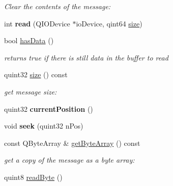 \begin{DoxyCompactItemize}
\begin{DoxyCompactList}\small\item\em Clear the contents of the message\+: \end{DoxyCompactList}\item 
int {\bfseries read} (Q\+I\+O\+Device $\ast$io\+Device, qint64 \hyperlink{class_i_o_buffer_a42b956c3deeece1c211f4d907b81df4f}{size})\hypertarget{class_i_o_buffer_afd3ae083064e09c37ed3051396aa77bd}{}\label{class_i_o_buffer_afd3ae083064e09c37ed3051396aa77bd}

\item 
bool \hyperlink{class_i_o_buffer_a8c1daae319f96022aa7581d599fa9c42}{has\+Data} ()\hypertarget{class_i_o_buffer_a8c1daae319f96022aa7581d599fa9c42}{}\label{class_i_o_buffer_a8c1daae319f96022aa7581d599fa9c42}

\begin{DoxyCompactList}\small\item\em returns true if there is still data in the buffer to read \end{DoxyCompactList}\item 
quint32 \hyperlink{class_i_o_buffer_a42b956c3deeece1c211f4d907b81df4f}{size} () const \hypertarget{class_i_o_buffer_a42b956c3deeece1c211f4d907b81df4f}{}\label{class_i_o_buffer_a42b956c3deeece1c211f4d907b81df4f}

\begin{DoxyCompactList}\small\item\em get message size\+: \end{DoxyCompactList}\item 
quint32 {\bfseries current\+Position} ()\hypertarget{class_i_o_buffer_addf52c4c0142a77cc813901b89142532}{}\label{class_i_o_buffer_addf52c4c0142a77cc813901b89142532}

\item 
void {\bfseries seek} (quint32 n\+Pos)\hypertarget{class_i_o_buffer_a6b2f3efb10d9d153e15f86d5af83123f}{}\label{class_i_o_buffer_a6b2f3efb10d9d153e15f86d5af83123f}

\item 
const Q\+Byte\+Array \& \hyperlink{class_i_o_buffer_a6a21eeca1fead702fc3a92f996e40e22}{get\+Byte\+Array} () const \hypertarget{class_i_o_buffer_a6a21eeca1fead702fc3a92f996e40e22}{}\label{class_i_o_buffer_a6a21eeca1fead702fc3a92f996e40e22}

\begin{DoxyCompactList}\small\item\em get a copy of the message as a byte array\+: \end{DoxyCompactList}\item 
quint8 \hyperlink{class_i_o_buffer_a05384fbfbb87b7c6a7e223277747c67c}{read\+Byte} ()\hypertarget{class_i_o_buffer_a05384fbfbb87b7c6a7e223277747c67c}{}\label{class_i_o_buffer_a05384fbfbb87b7c6a7e223277747c67c}


\end{DoxyCompactItemize}
